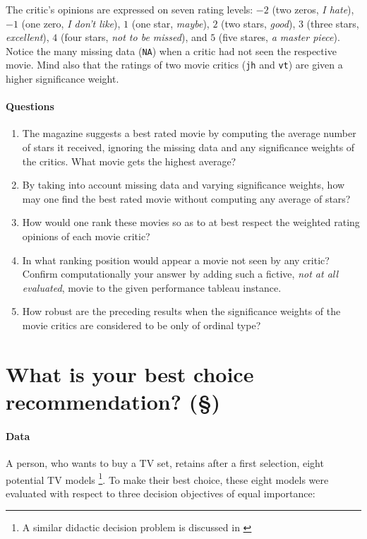 The critic's opinions are expressed on seven rating levels: $-2$ (two zeros, \emph{I hate}), $-1$ (one zero, \emph{I don't like}), $1$ (one star, \emph{maybe}), $2$ (two stars, \emph{good}), $3$ (three stars, \emph{excellent}), $4$ (four stars, \emph{not to be missed}), and $5$ (five stares, \emph{a master piece}). Notice the many missing data (\texttt{NA}) when a critic had not seen the respective movie. Mind also that the ratings of two movie critics (\texttt{jh} and \texttt{vt}) are given a higher significance weight.

\paragraph{\textbf{Questions}}

\begin{enumerate}
\item The \Graffiti magazine suggests a best rated movie by computing the average number of stars it received, ignoring the missing data and any significance weights of the critics. What movie gets the highest average? 
\item By taking into account missing data and varying significance weights, how may one find the best rated movie without computing any average of stars?
\item How would one rank these movies so as to at best respect the weighted rating opinions of each movie critic?
\item In what ranking position would appear a movie not seen by any critic? Confirm computationally your answer by adding such a fictive, \emph{not at all evaluated}, movie to the given performance tableau instance.
\item How robust are the preceding results when the significance weights of the movie critics are considered to be only of ordinal type?
\end{enumerate}

\section{What is your best choice recommendation? (§)}
\label{sec:15.3}


\paragraph{\textbf{Data}}

A person, who wants to buy a TV set, retains after a first selection, eight potential TV models \footnote{A similar didactic decision problem is discussed in \citet[pp.33-35]{VIN-1992}}. To make their best choice, these eight models were evaluated with respect to three decision objectives of equal importance:

